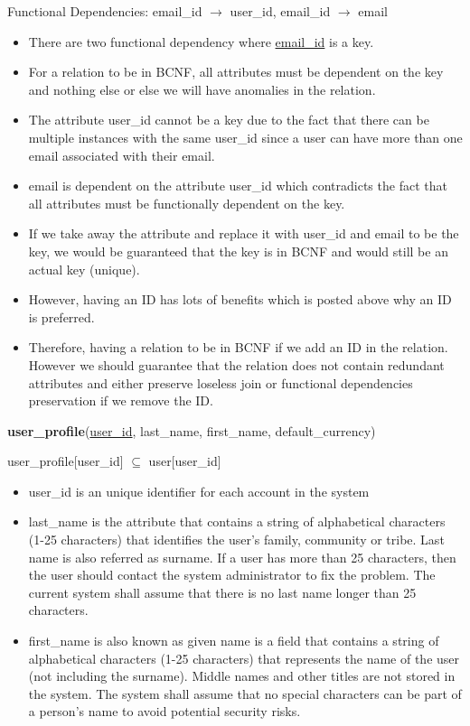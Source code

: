 \documentclass{article}
\begin{document}
Functional Dependencies: email\_id $\to$ user\_id, email\_id $\to$ email

\begin{itemize}
    \item There are two functional dependency where \underline{email\_id} is a key.
    \item For a relation to be in BCNF, all attributes must be dependent on the key and nothing else or else we will have anomalies in the relation.
    \item The attribute user\_id cannot be a key due to the fact that there can be multiple instances with the same user\_id since a user can have more than one email associated with their email.
    \item email is dependent on the attribute user\_id which contradicts the fact that all attributes must be functionally dependent on the key.
    \item If we take away the attribute and replace it with user\_id and email to be the key, we would be guaranteed that the key is in BCNF and would still be an actual key (unique). 
    \item However, having an ID has lots of benefits which is posted above why an ID is preferred.
    \item Therefore, having a relation to be in BCNF if we add an ID in the relation. However we should guarantee that the relation does not contain redundant attributes and either preserve loseless join or functional dependencies preservation if we remove the ID.
\end{itemize}

\textbf{user\_profile}(\underline{user\_id}, last\_name, first\_name, default\_currency)

user\_profile[user\_id] $\subseteq$ user[user\_id]
\\

\begin{itemize}
    \item user\_id is an unique identifier for each account in the system
    \item last\_name is the attribute that contains a string of alphabetical characters (1-25 characters) that identifies the user's family, community or tribe. Last name is also referred as surname. If a user has more than 25 characters, then the user should contact the system administrator to fix the problem. The current system shall assume that there is no last name longer than 25 characters.
    \item first\_name is also known as given name is a field that contains a string of alphabetical characters (1-25 characters) that represents the name of the user (not including the surname). Middle names and other titles are not stored in the system. The system shall assume that no special characters can be part of a person's name to avoid potential security risks.  
\end{itemize}
\end{document}
